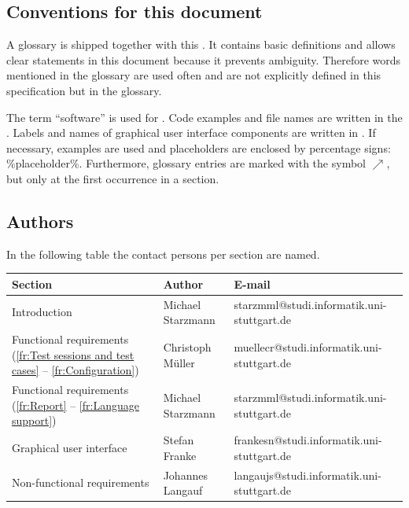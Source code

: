 \subsection{Conventions for this document} \label{in:Conventions for this document}
A glossary is shipped together with this . It contains basic definitions and allows clear statements in this document because it prevents ambiguity. Therefore words mentioned in the glossary are used often and are not explicitly defined in this specification but in the glossary.
\par
The term ``software'' is used for \gbt. Code examples and file names are written in the . Labels and names of graphical user interface components are written in . If necessary, examples are used and placeholders are enclosed by percentage signs: \%placeholder\%. Furthermore, glossary entries are marked with the symbol $\nearrow$, but only at the first occurrence in a section.

\subsection{Authors}
In the following table the contact persons per section are named.
{\small
\begin{longtable}{|p{35mm}|p{35mm}|l|} \hline
   {\normalsize \textbf{Section}} &
   {\normalsize \textbf{Author}} &
   {\normalsize \textbf{E-mail}} \\\hline \hline \endhead
   Introduction & Michael Starzmann & starzmml@studi.informatik.uni-stuttgart.de \\\hline
   Functional requirements (\ref{fr:Test sessions and test cases} -- \ref{fr:Configuration}) & Christoph Müller & muellecr@studi.informatik.uni-stuttgart.de \\\hline
   Functional requirements (\ref{fr:Report} -- \ref{fr:Language support}) & Michael Starzmann & starzmml@studi.informatik.uni-stuttgart.de \\\hline
   Graphical user interface & Stefan Franke & frankesn@studi.informatik.uni-stuttgart.de \\\hline
   Non-functional requirements & Johannes Langauf & langaujs@studi.informatik.uni-stuttgart.de \\\hline
\end{longtable}
}
